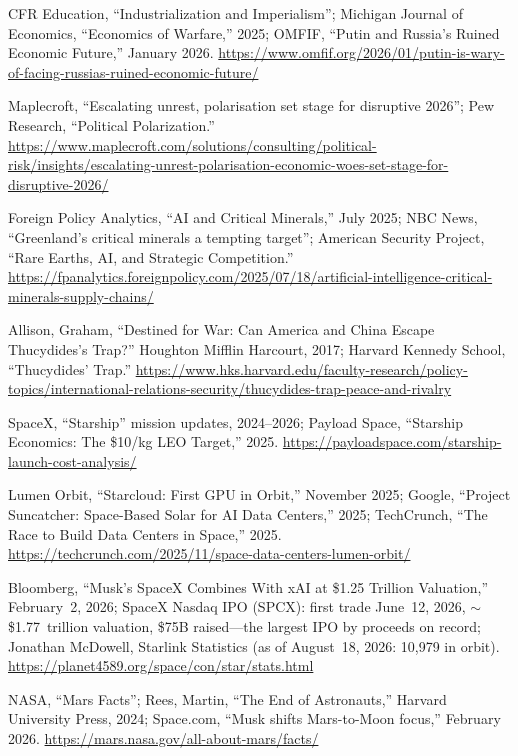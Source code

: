 \documentclass[11pt,a4paper]{article}
\begin{document}
\noindent [69] CFR Education, ``Industrialization and Imperialism''; Michigan Journal of Economics, ``Economics of Warfare,'' 2025; OMFIF, ``Putin and Russia's Ruined Economic Future,'' January 2026. \url{https://www.omfif.org/2026/01/putin-is-wary-of-facing-russias-ruined-economic-future/}

\noindent [70] Maplecroft, ``Escalating unrest, polarisation set stage for disruptive 2026''; Pew Research, ``Political Polarization.'' \url{https://www.maplecroft.com/solutions/consulting/political-risk/insights/escalating-unrest-polarisation-economic-woes-set-stage-for-disruptive-2026/}

\noindent [71] Foreign Policy Analytics, ``AI and Critical Minerals,'' July 2025; NBC News, ``Greenland's critical minerals a tempting target''; American Security Project, ``Rare Earths, AI, and Strategic Competition.'' \url{https://fpanalytics.foreignpolicy.com/2025/07/18/artificial-intelligence-critical-minerals-supply-chains/}

\noindent [72] Allison, Graham, ``Destined for War: Can America and China Escape Thucydides's Trap?'' Houghton Mifflin Harcourt, 2017; Harvard Kennedy School, ``Thucydides' Trap.'' \url{https://www.hks.harvard.edu/faculty-research/policy-topics/international-relations-security/thucydides-trap-peace-and-rivalry}

\noindent [73] SpaceX, ``Starship'' mission updates, 2024--2026; Payload Space, ``Starship Economics: The \$10/kg LEO Target,'' 2025. \url{https://payloadspace.com/starship-launch-cost-analysis/}

\noindent [74] Lumen Orbit, ``Starcloud: First GPU in Orbit,'' November 2025; Google, ``Project Suncatcher: Space-Based Solar for AI Data Centers,'' 2025; TechCrunch, ``The Race to Build Data Centers in Space,'' 2025. \url{https://techcrunch.com/2025/11/space-data-centers-lumen-orbit/}

\noindent [75] Bloomberg, ``Musk's SpaceX Combines With xAI at \$1.25 Trillion Valuation,'' February~2, 2026; SpaceX Nasdaq IPO (SPCX): first trade June~12, 2026, $\sim$\$1.77~trillion valuation, \$75B raised---the largest IPO by proceeds on record; Jonathan McDowell, Starlink Statistics (as of August~18, 2026: 10,979 in orbit). \url{https://planet4589.org/space/con/star/stats.html}

\noindent [76] NASA, ``Mars Facts''; Rees, Martin, ``The End of Astronauts,'' Harvard University Press, 2024; Space.com, ``Musk shifts Mars-to-Moon focus,'' February 2026. \url{https://mars.nasa.gov/all-about-mars/facts/}
\end{document}
